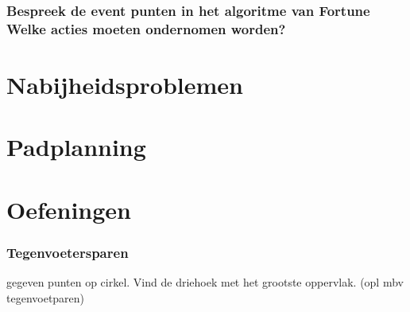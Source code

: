 \documentclass[12pt,a4paper]{article}
\begin{document}
\section{Bespreek de event punten in het algoritme van Fortune Welke acties moeten ondernomen worden?}
\fi

\part{Nabijheidsproblemen}
\iffalse
\section{wat betekent volgende uitspraak: probleem A is ?(N) transformeerbaar tot probleem B? waarvoor kan een dergelijke uitspraak nuttig gebruikt worden + vb}
\section{wat is een EMDB van een vz punten + verband met Voronoi diagramma van een vz punten?}
\section{bespreek beknopt hoe een EMDB van een vz punten kan berkend worden in O(nlogn) bewerkingen}
\fi

\part{Padplanning}
\iffalse
\section{Hoe bepaal je het gebied dat kan bereikt worden door een robotarm met 3 segmenten. Is de volgorde van de stukken belangrijk?}
\section{Geef en bespreek de minkovski-som met een voorbeeld.}
\fi
\fi

\part{Oefeningen}






\iffalse

\section{Tegenvoetersparen}
gegeven punten op cirkel. Vind de driehoek met het grootste oppervlak.
(opl mbv tegenvoetparen) 
\end{document}

